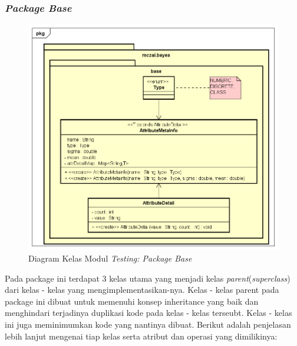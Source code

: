 \subsubsection{\textit{Package Base}}
\begin{figure}[H]
	\centering
	\includegraphics[scale=0.64]{ClassDiagramLengkap/CD_Test_BASE}
	\caption[Diagram Kelas Modul \textit{Testing: Package Base}]{Diagram Kelas Modul \textit{Testing: Package Base}}
	\label{fig:Diagram Kelas Modul Testing: Package Base}
\end{figure}

Pada package ini terdapat 3 kelas utama yang menjadi kelas \textit{parent}(\textit{superclass}) dari kelas - kelas yang mengimplementasikan-nya. Kelas - kelas parent pada package ini dibuat untuk memenuhi konsep inheritance yang baik dan menghindari terjadinya duplikasi kode pada kelas - kelas terseubt. Kelas - kelas ini juga meminimumkan kode yang nantinya dibuat. Berikut adalah penjelasan lebih lanjut mengenai tiap kelas serta atribut dan operasi yang dimilikinya:

